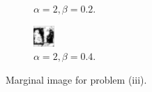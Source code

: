 \documentclass{article}
\begin{document}
\begin{figure}[t]
\begin{subfigure}[t]{0.25\textwidth}
  \vspace{-0.6cm}
  \caption{$\alpha=2, \beta=0.2$.}
  \label{f:iii-2}
\end{subfigure}
\begin{subfigure}[t]{0.25\textwidth}
  \centering
  \includegraphics[width=\textwidth]{iii_alpha_2_beta_0.4.bmp}
  \vspace{-0.6cm}
  \caption{$\alpha=2, \beta=0.4$.}
  \label{f:iii-3}
\end{subfigure}
\vspace{-0.3cm}
\caption{Marginal image for problem (iii).}
\label{f:denoise_iii}
\end{figure}
\end{document}
